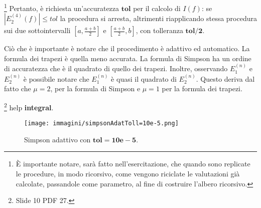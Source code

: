 \footnote{È importante notare, sarà fatto nell'esercitazione, che quando sono replicate le procedure, in modo ricorsivo, come vengono riciclate le valutazioni già calcolate, passandole come parametro, al fine di costruire l'albero ricorsivo.}
Pertanto, è richiesta un'accuratezza $\boldsymbol{tol}$ per il calcolo di $I(f)$: se $\left|E_2^{(4)}(f)\right|\leq tol$ la procedura si arresta, altrimenti riapplicando stessa procedura sui due sottointervalli $\left[a,\frac{a+b}{2}\right]$ e $\left[\frac{a+b}{2},b\right]$, con tolleranza $\boldsymbol{tol/2}$.

Ciò che è importante è notare che il procedimento è adattivo ed automatico. La formula dei trapezi è quella meno accurata. La formula di Simpson ha un ordine di accuratezza che è il quadrato di quello dei trapezi.
Inoltre, osservando $E_1^{(n)}$ e $E_2^{(n)}$ è possibile notare che $E_1^{(n)}$ è quasi il quadrato di $E_2^{(n)}$. Questo deriva dal fatto che $\mu=2$, per la formula di Simpson e $\mu=1$ per la formula dei trapezi.

\begin{remark}
    \footnote{Slide 10 PDF 27.} help \textbf{integral}.
\end{remark}

\begin{figure}
    \centering
    \texttt{[image: immagini/simpsonAdatToll=10e-5.png]}
    \caption{Simpson adattivo con $\boldsymbol{tol=10e-5}$.}\label{fig:simpsonAdatToll=10e-5}
\end{figure}

